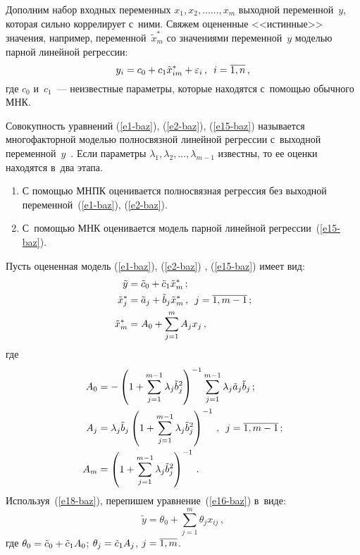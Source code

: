 \begin{multicols}{2}
  Дополним набор входных переменных $x_1, x_2, \ldots$\linebreak $\ldots , x_m$ выходной 
переменной~$y$, которая сильно коррелирует с~ними. Свяжем оцененные 
<<истинные>> значения, например, переменной~$\tilde{x}^*_m$ со значениями 
переменной~$y$ моделью парной линейной регрессии:
  \begin{equation}
  y_i= c_0+c_1\tilde{x}_{im}^* +\varepsilon_i\,,\enskip i=\overline{1,n}\,,
  \label{e15-baz}
  \end{equation}
где $c_0$ и~$c_1$~--- неизвестные параметры, которые находятся с~помощью 
обычного МНК.

  Совокупность уравнений (\ref{e1-baz}), (\ref{e2-baz}), (\ref{e15-baz}) называется 
многофакторной моделью полносвязной линейной регрессии с~выходной 
переменной~$y$~\cite{10-baz}. Если параметры $\lambda_1, \lambda_2,\ldots , 
\lambda_{m-1}$ известны, то ее оценки находятся в~два этапа.
  \begin{enumerate}[1.]
\item С помощью МНПК оценивается полносвязная регрессия без выходной 
переменной~(\ref{e1-baz}), (\ref{e2-baz}).
\item С~по\-мощью МНК оценивается модель парной линейной  
регрессии~(\ref{e15-baz}).
\end{enumerate}

  Пусть оцененная модель (\ref{e1-baz}), (\ref{e2-baz}) , (\ref{e15-baz}) имеет вид:
  \begin{align}
  \tilde{y} &= \tilde{c}_0 +\tilde{c}_1 \tilde{x}_m^*\,;\label{e16-baz}\\
  \tilde{x}_j^* &= \tilde{a}_j +\tilde{b}_j \tilde{x}_m^*\,,\enskip j=\overline{1,m-
1}\,; \notag%
\\
  \tilde{x}_m^*&=A_0 +\sum\limits^m_{j=1} A_j x_j\,,
  \label{e18-baz}
  \end{align}
где
\begin{align*}
A_0&=-\left( 1+\sum\limits^{m-1}_{j=1} \lambda_j \tilde{b}^2_j \right)^{-1} 
\sum\limits_{j=1}^{m-1} \lambda_j \tilde{a}_j \tilde{b}_j\,;\\
A_j&=\lambda_j \tilde{b}_j \left( 1+ \sum\limits^{m-1}_{j=1} \lambda_j 
\tilde{b}^2_j\right)^{-1}\,,\enskip j=\overline{1,m-1}\,;\\
A_m&=\left( 1+\sum\limits^{m-1}_{j=1} \lambda_j \tilde{b}_j^2\right)^{-1}\,.
\end{align*}
  Используя~(\ref{e18-baz}), перепишем уравнение~(\ref{e16-baz}) в~виде:
  \begin{equation}
  \tilde{y}=\theta_0 +\sum\limits^m_{j=1} \theta_j x_{ij}\,,
  \label{e19-baz}
  \end{equation}
где $\theta_0 =\tilde{c}_0 \hm+ \tilde{c}_1A_0$; $\theta_j\hm= \tilde{c}_1A_j$, 
$j\hm=\overline{1,m}$.
  

\end{multicols}
